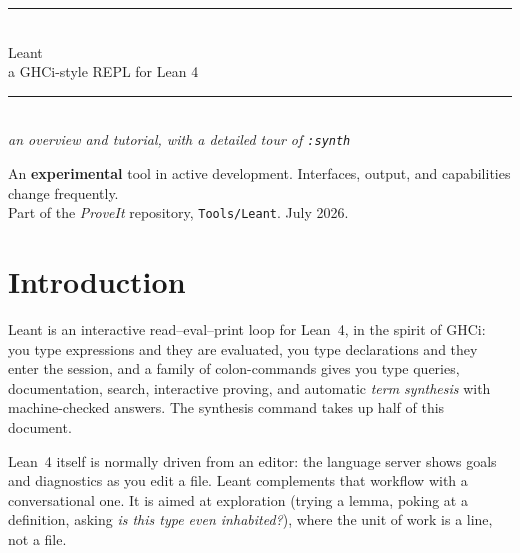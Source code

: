 \documentclass[11pt,oneside]{article}
\newcommand{\code}[1]{\texttt{#1}}
\begin{document}
\begin{titlepage}
\thispagestyle{empty}
\begin{center}
  {\color{sageline}\rule{0.55\textwidth}{0.8pt}}\\[1.7em]
  {\fontsize{34}{40}\selectfont Leant}\\[0.55em]
  {\Large a GHCi-style REPL for Lean 4}\\[1.5em]
  {\color{sageline}\rule{0.55\textwidth}{0.8pt}}\\[2.2em]
  {\large \emph{an overview and tutorial, with a detailed tour of \code{:synth}}}
\end{center}
\begin{center}
  \small\color{lichen}
  An \textbf{experimental} tool in active development.
  Interfaces, output, and capabilities change frequently.\\[0.6em]
  Part of the \emph{ProveIt} repository, \code{Tools/Leant}.\quad
  July 2026.
\end{center}
\end{titlepage}

\clearpage
{\hypersetup{linkcolor=ink}%
 \tableofcontents
 }
\clearpage

\section{Introduction}\label{sec:intro}

Leant is an interactive read--eval--print loop for Lean~4, in the
spirit of GHCi: you type expressions and they are evaluated, you type
declarations and they enter the session, and a family of colon-commands
gives you type queries, documentation, search, interactive proving,
and automatic \emph{term synthesis} with machine-checked answers.
The synthesis command takes up half of this document.

Lean~4 itself is normally driven from an editor: the language server
shows goals and diagnostics as you edit a file. Leant complements that
workflow with a conversational one. It is aimed at exploration (trying a
lemma, poking at a definition, asking \emph{is this type even
inhabited?}), where the unit of work is a line, not a file.
\end{document}
